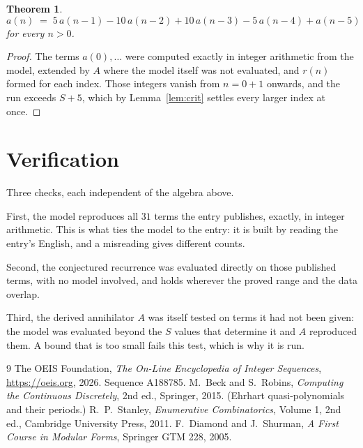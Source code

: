 \documentclass[11pt,a4paper]{article}
\theoremstyle{plain}
\newtheorem{theorem}{Theorem}
\theoremstyle{definition}
\begin{document}
\begin{theorem}
\[
a(n)\;=\;5\,a(n-1) - 10\,a(n-2) + 10\,a(n-3) - 5\,a(n-4) + a(n-5)
\]
for every $n>0$.
\end{theorem}

\begin{proof}
The terms $a(0),\dots$ were computed exactly in integer arithmetic from the model, extended by
$A$ where the model itself was not evaluated, and $r(n)$ formed for each index. Those integers
vanish from $n=0+1$ onwards, and the run exceeds $S+5$, which by
Lemma~\ref{lem:crit} settles every larger index at once.
\end{proof}

\section{Verification}

Three checks, each independent of the algebra above.

First, the model reproduces all $31$ terms the entry publishes, exactly, in integer
arithmetic. This is what ties the model to the entry: it is built by reading the entry's
English, and a misreading gives different counts.

Second, the conjectured recurrence was evaluated directly on those published terms, with no
model involved, and holds wherever the proved range and the data overlap.

Third, the derived annihilator $A$ was itself tested on terms it had not been given: the model
was evaluated beyond the $S$ values that determine it and $A$ reproduced them. A bound that is
too small fails this test, which is why it is run.

\begin{thebibliography}{9}
 The OEIS Foundation, \emph{The On-Line Encyclopedia of Integer
Sequences}, \url{https://oeis.org}, 2026. Sequence A188785.
 M.~Beck and S.~Robins, \emph{Computing the Continuous Discretely},
2nd ed., Springer, 2015. (Ehrhart quasi-polynomials and their periods.)
 R.~P.~Stanley, \emph{Enumerative Combinatorics}, Volume 1, 2nd ed.,
Cambridge University Press, 2011.
 F.~Diamond and J.~Shurman, \emph{A First Course in Modular Forms},
Springer GTM 228, 2005.
\end{thebibliography}
\end{document}
